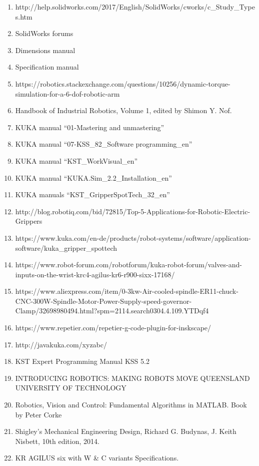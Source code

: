\begin{enumerate}
	\item http://help.solidworks.com/2017/English/SolidWorks/cworks/c\_Study\_Types.htm 
	\item SolidWorks forums
	\item Dimensions manual 
	\item Specification manual
	\item https://robotics.stackexchange.com/questions/10256/dynamic-torque-simulation-for-a-6-dof-robotic-arm
	\item Handbook of Industrial Robotics, Volume 1, edited by Shimon Y. Nof. 
	\item KUKA manual “01-Mastering and unmastering”
	\item KUKA manual “07-KSS\_82\_Software programming\_en”
	\item KUKA manual “KST\_WorkVisual\_en”
	\item KUKA manual “KUKA.Sim\_2.2\_Installation\_en”
	\item KUKA manuals “KST\_GripperSpotTech\_32\_en”
	\item http://blog.robotiq.com/bid/72815/Top-5-Applications-for-Robotic-Electric-Grippers 
	\item https://www.kuka.com/en-de/products/robot-systems/software/application-software/kuka\_gripper\_spottech 
	\item https://www.robot-forum.com/robotforum/kuka-robot-forum/valves-and-inputs-on-the-wrist-krc4-agilus-kr6-r900-sixx-17168/ 
\item https://www.aliexpress.com/item/0-3kw-Air-cooled-spindle-ER11-chuck-CNC-300W-Spindle-Motor-Power-Supply-speed-governor-Clamp/32698980494.html?spm=2114.search0304.4.109.YTDqf4 
	\item https://www.repetier.com/repetier-g-code-plugin-for-inskscape/
	\item http://javakuka.com/xyzabc/
	\item KST Expert Programming Manual KSS 5.2
	\item INTRODUCING ROBOTICS: MAKING ROBOTS MOVE QUEENSLAND UNIVERSITY OF TECHNOLOGY
	\item Robotics, Vision and Control: Fundamental Algorithms in MATLAB. Book by Peter Corke
	\item Shigley’s Mechanical Engineering Design, Richard G. Budynas, J. Keith Nisbett, 10th edition, 2014.
	\item KR AGILUS six with W \& C variants Specifications.
	 

\end{enumerate}
